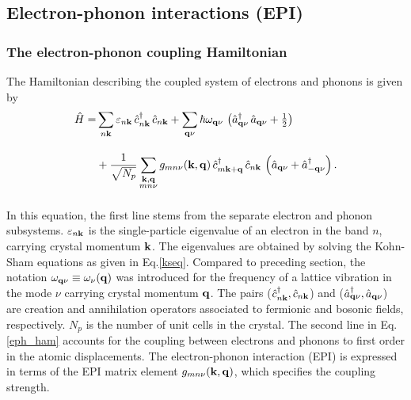 \subsection{Electron-phonon interactions (EPI)}\label{subsec_epc}

\subsubsection{The electron-phonon coupling Hamiltonian}
The Hamiltonian describing the coupled system of electrons and phonons is given by\cite{Giustino}
%
\begin{equation}\label{eph_ham}
  \begin{aligned}
    \hat{H}  = & \sum_{n\mathbf{k}} \varepsilon_{n\mathbf{k}}\,\hat{c}^\dagger_{n\mathbf{k}}\,\hat{c}_{n\mathbf{k}} + \sum_{\mathbf{q}\nu}\hbar\omega_{\mathbf{q}\nu}\,\left(\hat{a}^\dagger_{\mathbf{q}\nu}\,\hat{a}_{\mathbf{q}\nu} + \tfrac{1}{2}\right) \\[10pt]
    & + \frac{1}{\sqrt{N_p}}\sum_{\substack{\mathbf{k},\mathbf{q} \\ mn\nu}}g_{mn\nu}(\mathbf{k},\mathbf{q})\,\hat{c}^\dagger_{m\mathbf{k+q}}\,\hat{c}_{n\mathbf{k}}\,\left(\hat{a}_{\mathbf{q}\nu} + \hat{a}^\dagger_{-\mathbf{q}\nu}\right).\\[10pt]
\end{aligned}  
\end{equation}
%
In this equation, the first line stems from the separate electron and phonon subsystems. $\varepsilon_{n\mathbf{k}}$ is the single-particle eigenvalue of an electron in the band $n$, carrying crystal momentum $\mathbf{k}$. The eigenvalues are obtained by solving the Kohn-Sham equations as given in Eq.\;\eqref{kseq}. Compared to preceding section, the notation $\omega_{\mathbf{q}\nu}\equiv\omega_{\nu}(\mathbf{q})$ was introduced for the frequency of a lattice vibration in the mode $\nu$ carrying crystal momentum $\mathbf{q}$. The pairs ($\hat{c}^\dagger_{n\mathbf{k}},\hat{c}_{n\mathbf{k}}$) and ($\hat{a}^\dagger_{\mathbf{q}\nu},\hat{a}_{\mathbf{q}\nu}$) are creation and annihilation operators associated to fermionic and bosonic fields, respectively. $N_p$ is the number of unit cells in the crystal. The second line in Eq.\;\eqref{eph_ham} accounts for the coupling between electrons and phonons to first order in the atomic
displacements. The electron-phonon interaction (EPI) is expressed in terms of the EPI matrix element $g_{mn\nu}(\mathbf{k},\mathbf{q})$, which specifies the coupling strength.

